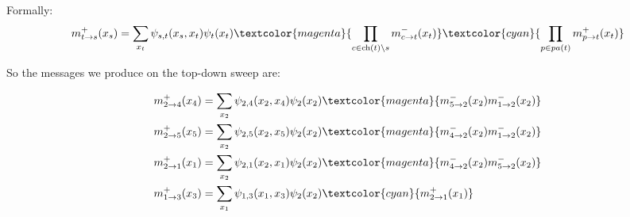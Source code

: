 \documentclass{harvardml}
\theoremstyle{definition}
\theoremstyle{plain}
\theoremstyle{definition}
\theoremstyle{remark}
\begin{document}
\begin{itemize}
Formally:
$$m_{t \rightarrow s}^{+} (x_s) = \sum_{x_t}\psi_{s,t}(x_s,x_t)\psi_t(x_t) 
\textcolor{magenta}{\prod_{c \in \text{ch}(t)\setminus s} m_{c \rightarrow t}^{-}(x_t)} \textcolor{cyan}{\prod_{p \in pa(t)} m_{p \rightarrow t}^{+}(x_t)}$$

So the messages we produce on the top-down sweep are:

\begin{align*}
    m_{2 \rightarrow 4}^{+} (x_4) &= \sum_{x_2} \psi_{2,4}(x_2,x_4)\psi_2(x_2) \textcolor{magenta}{m_{5 \rightarrow 2}^{-}(x_2)  m_{1 \rightarrow 2}^{-}(x_2)}\\ %
    m_{2 \rightarrow 5}^{+} (x_5) &= \sum_{x_2} \psi_{2,5}(x_2,x_5)\psi_2(x_2) \textcolor{magenta}{m_{4 \rightarrow 2}^{-}(x_2)  m_{1 \rightarrow 2}^{-}(x_2)}\\
    m_{2 \rightarrow 1}^{+} (x_1) &= \sum_{x_2} \psi_{2,1}(x_2,x_1)\psi_2(x_2) \textcolor{magenta}{m_{4 \rightarrow 2}^{-}(x_2)  m_{5 \rightarrow 2}^{-}(x_2)}\\
    m_{1 \rightarrow 3}^{+} (x_3) &= \sum_{x_1} \psi_{1,3}(x_1,x_3)\psi_2(x_2) \textcolor{cyan}{m_{2 \rightarrow 1}^{+}(x_1)}\\
\end{align*}
\end{itemize}
\medskip 
\end{document}
